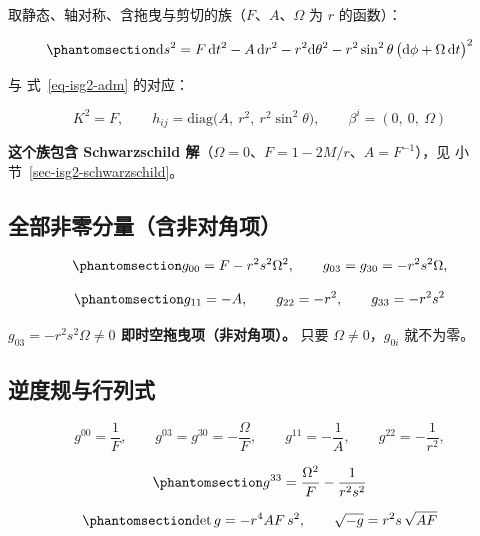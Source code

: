 \documentclass[
  chinese,
  a4paper,
  UTF8,
  12pt,
  oneside,
  openany]{ctexbook}
\theoremstyle{plain}
\theoremstyle{plain}
\theoremstyle{plain}
\theoremstyle{definition}
\theoremstyle{plain}
\theoremstyle{plain}
\theoremstyle{remark}
\begin{document}
取静态、轴对称、含拖曳与剪切的族（\(F\)、\(A\)、\(\Omega\) 为 \(r\)
的函数）：

\begin{equation}\protect\phantomsection\label{eq-isg2-family}{
\mathrm{d}s^{2}=F\,\mathrm{d}t^{2}-A\,\mathrm{d}r^{2}-r^{2}\mathrm{d}\theta^{2}
-r^{2}\sin^{2}\theta\,\bigl(\mathrm{d}\phi+\Omega\,\mathrm{d}t\bigr)^{2}
}\end{equation}

与 式~\ref{eq-isg2-adm} 的对应：

\[
K^{2}=F,\qquad h_{ij}=\mathrm{diag}\bigl(A,\ r^{2},\ r^{2}\sin^{2}\theta\bigr),\qquad
\beta^{i}=(0,\ 0,\ \Omega)
\]

\textbf{这个族包含 Schwarzschild
解}（\(\Omega=0\)、\(F=1-2M/r\)、\(A=F^{-1}\)），见
小节~\ref{sec-isg2-schwarzschild}。

\subsection{全部非零分量（含非对角项）}\label{ux5168ux90e8ux975eux96f6ux5206ux91cfux542bux975eux5bf9ux89d2ux9879}

\begin{equation}\protect\phantomsection\label{eq-isg2-g00}{
g_{00}=F-r^{2}s^{2}\Omega^{2},\qquad
g_{03}=g_{30}=-r^{2}s^{2}\Omega,
}\end{equation}

\begin{equation}\protect\phantomsection\label{eq-isg2-gij}{
g_{11}=-A,\qquad g_{22}=-r^{2},\qquad g_{33}=-r^{2}s^{2}
}\end{equation}

\textbf{\(g_{03}=-r^{2}s^{2}\Omega\neq0\) 即时空拖曳项（非对角项）。}
只要 \(\Omega\neq0\)，\(g_{0i}\) 就不为零。

\subsection{逆度规与行列式}\label{ux9006ux5ea6ux89c4ux4e0eux884cux5217ux5f0f}

\[
g^{00}=\frac{1}{F},\qquad g^{03}=g^{30}=-\frac{\Omega}{F},\qquad
g^{11}=-\frac{1}{A},\qquad g^{22}=-\frac{1}{r^{2}},
\]

\begin{equation}\protect\phantomsection\label{eq-isg2-ginv}{
g^{33}=\frac{\Omega^{2}}{F}-\frac{1}{r^{2}s^{2}}
}\end{equation}

\begin{equation}\protect\phantomsection\label{eq-isg2-det}{
\det g=-r^{4}AF\,s^{2},\qquad \sqrt{-g}=r^{2}s\,\sqrt{AF}
}\end{equation}
\end{document}
